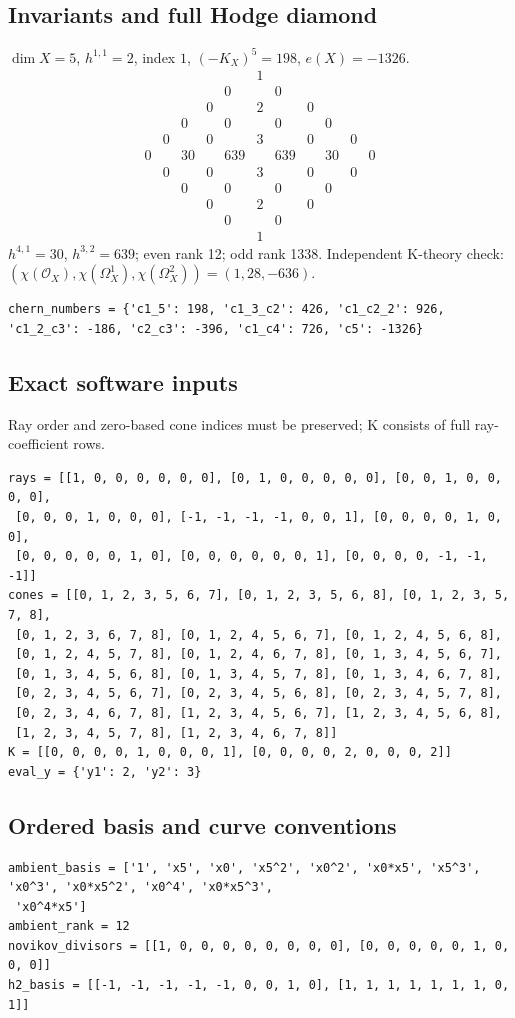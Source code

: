 \documentclass[10pt,a4paper]{article}
\begin{document}
\subsection*{Invariants and full Hodge diamond}
$\dim X=5$, $h^{1,1}=2$, index $1$, $(-K_X)^5=198$, $e(X)=-1326$.
\[\begin{array}{ccccccccccc}&&&&&1&&&&&\\&&&&0&&0&&&&\\&&&0&&2&&0&&&\\&&0&&0&&0&&0&&\\&0&&0&&3&&0&&0&\\0&&30&&639&&639&&30&&0\\&0&&0&&3&&0&&0&\\&&0&&0&&0&&0&&\\&&&0&&2&&0&&&\\&&&&0&&0&&&&\\&&&&&1&&&&&\end{array}\]
$h^{4,1}=30$, $h^{3,2}=639$; even rank 12; odd rank 1338.
Independent K-theory check: $(\chi(\mathcal O_X),\chi(\Omega_X^1),\chi(\Omega_X^2))=(1, 28, -636)$.
\begin{lstlisting}
chern_numbers = {'c1_5': 198, 'c1_3_c2': 426, 'c1_c2_2': 926, 'c1_2_c3': -186, 'c2_c3': -396, 'c1_c4': 726, 'c5': -1326}
\end{lstlisting}
\subsection*{Exact software inputs}
Ray order and zero-based cone indices must be preserved; K consists of full ray-coefficient rows.
\begin{lstlisting}
rays = [[1, 0, 0, 0, 0, 0, 0], [0, 1, 0, 0, 0, 0, 0], [0, 0, 1, 0, 0, 0, 0],
 [0, 0, 0, 1, 0, 0, 0], [-1, -1, -1, -1, 0, 0, 1], [0, 0, 0, 0, 1, 0, 0],
 [0, 0, 0, 0, 0, 1, 0], [0, 0, 0, 0, 0, 0, 1], [0, 0, 0, 0, -1, -1, -1]]
cones = [[0, 1, 2, 3, 5, 6, 7], [0, 1, 2, 3, 5, 6, 8], [0, 1, 2, 3, 5, 7, 8],
 [0, 1, 2, 3, 6, 7, 8], [0, 1, 2, 4, 5, 6, 7], [0, 1, 2, 4, 5, 6, 8],
 [0, 1, 2, 4, 5, 7, 8], [0, 1, 2, 4, 6, 7, 8], [0, 1, 3, 4, 5, 6, 7],
 [0, 1, 3, 4, 5, 6, 8], [0, 1, 3, 4, 5, 7, 8], [0, 1, 3, 4, 6, 7, 8],
 [0, 2, 3, 4, 5, 6, 7], [0, 2, 3, 4, 5, 6, 8], [0, 2, 3, 4, 5, 7, 8],
 [0, 2, 3, 4, 6, 7, 8], [1, 2, 3, 4, 5, 6, 7], [1, 2, 3, 4, 5, 6, 8],
 [1, 2, 3, 4, 5, 7, 8], [1, 2, 3, 4, 6, 7, 8]]
K = [[0, 0, 0, 0, 1, 0, 0, 0, 1], [0, 0, 0, 0, 2, 0, 0, 0, 2]]
eval_y = {'y1': 2, 'y2': 3}
\end{lstlisting}
\subsection*{Ordered basis and curve conventions}
\begin{lstlisting}
ambient_basis = ['1', 'x5', 'x0', 'x5^2', 'x0^2', 'x0*x5', 'x5^3', 'x0^3', 'x0*x5^2', 'x0^4', 'x0*x5^3',
 'x0^4*x5']
ambient_rank = 12
novikov_divisors = [[1, 0, 0, 0, 0, 0, 0, 0, 0], [0, 0, 0, 0, 0, 1, 0, 0, 0]]
h2_basis = [[-1, -1, -1, -1, -1, 0, 0, 1, 0], [1, 1, 1, 1, 1, 1, 1, 0, 1]]
\end{lstlisting}
\end{document}
